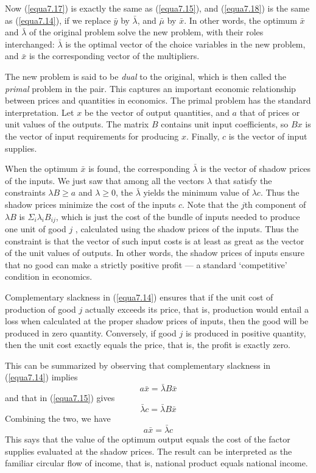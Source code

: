 Now (\ref{equa7.17}) is exactly the same as (\ref{equa7.15}), and (\ref{equa7.18}) is the same as (\ref{equa7.14}), if we replace $\bar{y}$ by $\bar{\lambda}$, and $\bar{\mu}$ by $\bar{x}$. In other words, the optimum $\bar{x}$ and $\bar{\lambda}$ of the original problem solve the new problem, with their roles interchanged: $\bar{\lambda}$ is the optimal vector of the choice variables in the new problem, and $\bar{x}$ is the corresponding vector of the multipliers.

The new problem is said to be \textit{dual} to the original, which is then called the \textit{primal} problem in the pair. This captures an important economic relationship between prices and quantities in economics. The primal problem has the standard interpretation. Let $x$ be the vector of output quantities, and $a$ that of prices or unit values of the outputs. The matrix $B$ contains unit input coefficients, so $Bx$ is the vector of input requirements for producing $x$. Finally, $c$ is the vector of input supplies.

When the optimum $\bar{x}$ is found, the corresponding $\bar{\lambda}$ is the vector of shadow prices of the inputs. We just saw that among all the vectors $\lambda$ that satisfy the constraints $\lambda B \geq a$ and $\lambda \geq 0$, the $\bar{\lambda}$ yields the minimum value of $\lambda c$. Thus the shadow prices minimize the cost of the inputs $c$. Note that the $j$th component of $\lambda B$ is $\Sigma_i \lambda_i B_{ij}$, which is just the cost of the bundle of inputs needed to produce one unit of good $j$ , calculated using the shadow prices of the inputs. Thus the constraint is that the vector of such input costs is at least as great as the vector of the unit values of outputs. In other words, the shadow prices of inputs ensure that no good can make a strictly positive profit — a standard `competitive' condition in economics.

Complementary slackness in (\ref{equa7.14}) ensures that if the unit cost of production of good $j$ actually exceeds its price, that is, production would entail a loss when calculated at the proper shadow prices of inputs, then the good will be produced in zero quantity. Conversely, if good $j$ is produced in positive quantity, then the unit cost exactly equals the price, that is, the profit is exactly zero.

This can be summarized by observing that complementary slackness in (\ref{equa7.14}) implies
\begin{equation*}
 a \bar{x} = \bar{\lambda} B \bar{x}
\end{equation*}
and that in (\ref{equa7.15}) gives
\begin{equation*}
  \bar{\lambda} c = \bar{\lambda} B \bar{x}
\end{equation*}
Combining the two, we have
\begin{equation} \label{equa7.19}
a \bar{x} = \bar{\lambda} c
\end{equation}
This says that the value of the optimum output equals the cost of the factor supplies evaluated at the shadow prices. The result can be interpreted as the familiar circular flow of income, that is, national product equals national income.

